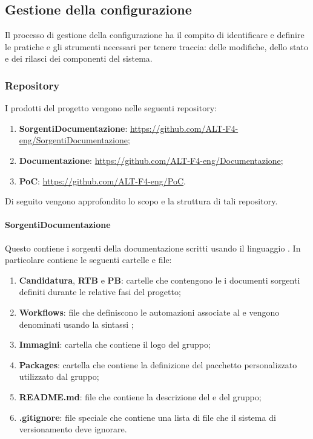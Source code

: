 \subsection{Gestione della configurazione}
\label{subsec:gestione_della_configurazione}
Il processo di gestione della configurazione ha il compito di identificare e definire le pratiche e gli strumenti necessari per tenere traccia: delle modifiche, dello stato e dei rilasci dei componenti del sistema.

\subsubsection{Repository}
\label{subsubsec:repository}
I prodotti del progetto vengono nelle seguenti repository:
\begin{enumerate}
    \item \textbf{SorgentiDocumentazione}: \href{https://github.com/ALT-F4-eng/SorgentiDocumentazione}{https://github.com/ALT-F4-eng/SorgentiDocumentazione};
    \item \textbf{Documentazione}: \href{https://github.com/ALT-F4-eng/Documentazione}{https://github.com/ALT-F4-eng/Documentazione};
    \item \textbf{PoC}: \href{https://github.com/ALT-F4-eng/PoC}{https://github.com/ALT-F4-eng/PoC}.
\end{enumerate}
Di seguito vengono approfondito lo scopo e la struttura di tali repository.

\paragraph{SorgentiDocumentazione}
Questo  contiene i sorgenti della documentazione scritti usando il linguaggio .
In particolare contiene le seguenti cartelle e file:
\begin{enumerate}
    \item \textbf{Candidatura}, \textbf{RTB} e \textbf{PB}: cartelle che contengono le i documenti sorgenti definiti durante le relative fasi del progetto;
    
    \item \textbf{Workflows}: file che definiscono le automazioni associate al  e vengono denominati usando la sintassi ;
    
    \item \textbf{Immagini}: cartella che contiene il logo del gruppo;
    
    \item \textbf{Packages}: cartella che contiene la definizione del pacchetto  personalizzato utilizzato dal gruppo;
    
    \item \textbf{README.md}: file che contiene la descrizione del  e del gruppo;
    
    \item \textbf{.gitignore}: file speciale che contiene una lista di file che il sistema di versionamento deve ignorare.
\end{enumerate}

